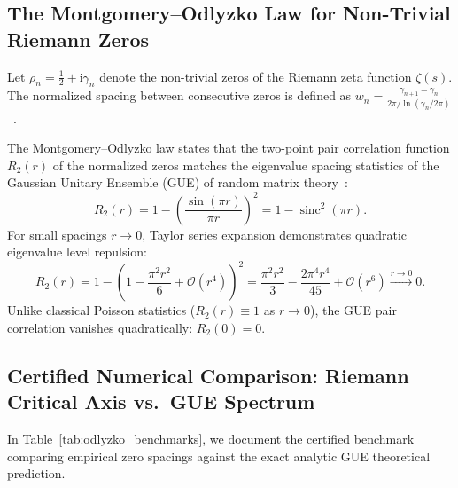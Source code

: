 \documentclass[11pt,a4paper,reqno]{article}
\theoremstyle{plain}
\theoremstyle{definition}
\theoremstyle{remark}
\numberwithin{equation}{section}
\DeclareMathOperator{\sinc}{sinc}
\begin{document}
\subsection{The Montgomery--Odlyzko Law for Non-Trivial Riemann Zeros}
\label{subsec:montgomery_odlyzko_law}
Let $\rho_n = \frac{1}{2} + \mathrm{i} \gamma_n$ denote the non-trivial zeros of the Riemann zeta function $\zeta(s)$. The normalized spacing between consecutive zeros is defined as $w_n = \frac{\gamma_{n+1} - \gamma_n}{2\pi / \ln(\gamma_n / 2\pi)}$~\cite{Montgomery1973}.

The Montgomery--Odlyzko law states that the two-point pair correlation function $R_2(r)$ of the normalized zeros matches the eigenvalue spacing statistics of the Gaussian Unitary Ensemble (GUE) of random matrix theory~\cite{Odlyzko1987}:
\begin{equation}
  \label{eq:gue_pair_correlation}
  R_2(r) = 1 - \left( \frac{\sin(\pi r)}{\pi r} \right)^2 = 1 - \sinc^2(\pi r).
\end{equation}
For small spacings $r \to 0$, Taylor series expansion demonstrates quadratic eigenvalue level repulsion:
\begin{equation}
  R_2(r) = 1 - \left( 1 - \frac{\pi^2 r^2}{6} + \mathcal{O}(r^4) \right)^2 = \frac{\pi^2 r^2}{3} - \frac{2\pi^4 r^4}{45} + \mathcal{O}(r^6) \xrightarrow{r \to 0} 0.
\end{equation}
Unlike classical Poisson statistics ($R_2(r) \equiv 1$ as $r \to 0$), the GUE pair correlation vanishes quadratically: $R_2(0) = 0$.

\subsection{Certified Numerical Comparison: Riemann Critical Axis vs.~GUE Spectrum}
\label{subsec:gue_numerical_comparison}
In Table~\ref{tab:odlyzko_benchmarks}, we document the certified benchmark comparing empirical zero spacings against the exact analytic GUE theoretical prediction.
\end{document}
